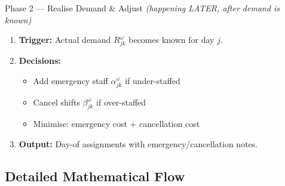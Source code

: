 \documentclass[12pt,a4paper]{article}
\begin{document}
\vspace{8pt}
\begin{phasebox}[accentgreen]{Phase 2 — Realise Demand \& Adjust \hfill\textit{(happening LATER, after demand is known)}}
\begin{enumerate}[itemsep=3pt]
  \item \textbf{Trigger:} Actual demand $R_{jk}^{\omega}$ becomes known for day $j$.
  \item \textbf{Decisions:}
    \begin{itemize}
      \item Add emergency staff $\alpha_{jk}^{\omega}$ if under-staffed
      \item Cancel shifts $\beta_{jk}^{\omega}$ if over-staffed
      \item Minimise: emergency cost + cancellation cost
    \end{itemize}
  \item \textbf{Output:} Day-of assignments with emergency/cancellation notes.
\end{enumerate}
\end{phasebox}

\newpage
\subsection{Detailed Mathematical Flow}
\end{document}
